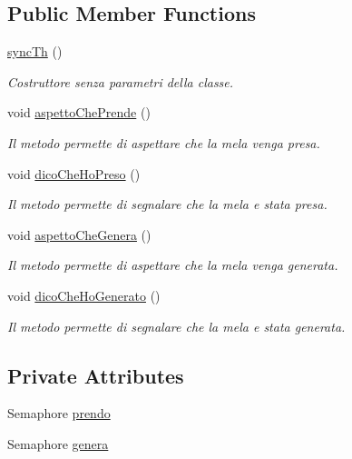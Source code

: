 \subsection*{Public Member Functions}
\begin{DoxyCompactItemize}
\item 
\mbox{\hyperlink{class_snake_1_1game_1_1utility_1_1sync_th_abef3d4e3630108b2352b7741358a40e6}{sync\+Th}} ()
\begin{DoxyCompactList}\small\item\em Costruttore senza parametri della classe. \end{DoxyCompactList}\item 
void \mbox{\hyperlink{class_snake_1_1game_1_1utility_1_1sync_th_a8e454b3430022fcccd7ecf338441c1bf}{aspetto\+Che\+Prende}} ()
\begin{DoxyCompactList}\small\item\em Il metodo permette di aspettare che la mela venga presa. \end{DoxyCompactList}\item 
void \mbox{\hyperlink{class_snake_1_1game_1_1utility_1_1sync_th_a56a1409c7c23a1238719bd1dd4430fc7}{dico\+Che\+Ho\+Preso}} ()
\begin{DoxyCompactList}\small\item\em Il metodo permette di segnalare che la mela e\textquotesingle{} stata presa. \end{DoxyCompactList}\item 
void \mbox{\hyperlink{class_snake_1_1game_1_1utility_1_1sync_th_a1fb318d4f1722f999b5af474befc8b67}{aspetto\+Che\+Genera}} ()
\begin{DoxyCompactList}\small\item\em Il metodo permette di aspettare che la mela venga generata. \end{DoxyCompactList}\item 
void \mbox{\hyperlink{class_snake_1_1game_1_1utility_1_1sync_th_a952f218c604508fb98a470f6a648a956}{dico\+Che\+Ho\+Generato}} ()
\begin{DoxyCompactList}\small\item\em Il metodo permette di segnalare che la mela e\textquotesingle{} stata generata. \end{DoxyCompactList}\end{DoxyCompactItemize}
\subsection*{Private Attributes}
\begin{DoxyCompactItemize}
\item 
Semaphore \mbox{\hyperlink{class_snake_1_1game_1_1utility_1_1sync_th_a89d3d89697eb53a38c5b5693c5fb47b4}{prendo}}
\item 
Semaphore \mbox{\hyperlink{class_snake_1_1game_1_1utility_1_1sync_th_a7a33fca357e48a689ce6c1924185b710}{genera}}
\end{DoxyCompactItemize}



